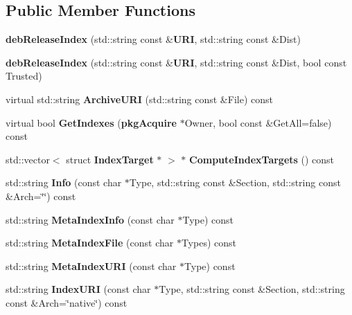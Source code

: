 \subsection*{\-Public \-Member \-Functions}
\begin{DoxyCompactItemize}
\item 
{\bfseries deb\-Release\-Index} (std\-::string const \&{\bf \-U\-R\-I}, std\-::string const \&\-Dist)\label{classdebReleaseIndex_a67350e4cca1b16179a98cd779591afcb}

\item 
{\bfseries deb\-Release\-Index} (std\-::string const \&{\bf \-U\-R\-I}, std\-::string const \&\-Dist, bool const \-Trusted)\label{classdebReleaseIndex_a2198b0f7316ea0ddbbb86e7914e89b69}

\item 
virtual std\-::string {\bfseries \-Archive\-U\-R\-I} (std\-::string const \&\-File) const \label{classdebReleaseIndex_a1368125277a43a3b8adb16305a8c9aed}

\item 
virtual bool {\bfseries \-Get\-Indexes} ({\bf pkg\-Acquire} $\ast$\-Owner, bool const \&\-Get\-All=false) const \label{classdebReleaseIndex_ab569cf37699d948c0802549b83628d5e}

\item 
std\-::vector$<$ struct \*
{\bf \-Index\-Target} $\ast$ $>$ $\ast$ {\bfseries \-Compute\-Index\-Targets} () const \label{classdebReleaseIndex_add4eb2ba608261803c00706f3259ef51}

\item 
std\-::string {\bfseries \-Info} (const char $\ast$\-Type, std\-::string const \&\-Section, std\-::string const \&\-Arch=\char`\"{}\char`\"{}) const \label{classdebReleaseIndex_aa80f4ef14c77282024088274defa5c84}

\item 
std\-::string {\bfseries \-Meta\-Index\-Info} (const char $\ast$\-Type) const \label{classdebReleaseIndex_a14e49955d787ee3f90c450ac58a6645f}

\item 
std\-::string {\bfseries \-Meta\-Index\-File} (const char $\ast$\-Types) const \label{classdebReleaseIndex_ade3aa0391ff471bd0523a86cc88887a1}

\item 
std\-::string {\bfseries \-Meta\-Index\-U\-R\-I} (const char $\ast$\-Type) const \label{classdebReleaseIndex_a3a6159ad6e600ef42a08a63692ad078c}

\item 
std\-::string {\bfseries \-Index\-U\-R\-I} (const char $\ast$\-Type, std\-::string const \&\-Section, std\-::string const \&\-Arch=\char`\"{}native\char`\"{}) const \label{classdebReleaseIndex_a36b933ad804c5f1129f21a2f56fdca03}


\end{DoxyCompactItemize}
